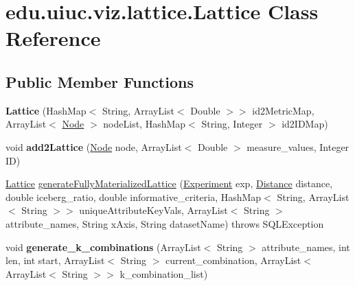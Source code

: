 \hypertarget{classedu_1_1uiuc_1_1viz_1_1lattice_1_1_lattice}{}\section{edu.\+uiuc.\+viz.\+lattice.\+Lattice Class Reference}
\label{classedu_1_1uiuc_1_1viz_1_1lattice_1_1_lattice}
\subsection*{Public Member Functions}
\begin{DoxyCompactItemize}
\item 
\mbox{\label{classedu_1_1uiuc_1_1viz_1_1lattice_1_1_lattice_a496de455ff51eeb81becb5469c24d8c8}} 
{\bfseries Lattice} (Hash\+Map$<$ String, Array\+List$<$ Double $>$$>$ id2\+Metric\+Map, Array\+List$<$ \mbox{\hyperlink{classedu_1_1uiuc_1_1viz_1_1lattice_1_1_node}{Node}} $>$ node\+List, Hash\+Map$<$ String, Integer $>$ id2\+I\+D\+Map)
\item 
\mbox{\label{classedu_1_1uiuc_1_1viz_1_1lattice_1_1_lattice_a4943398fe6944f68fd00ac4006b94403}} 
void {\bfseries add2\+Lattice} (\mbox{\hyperlink{classedu_1_1uiuc_1_1viz_1_1lattice_1_1_node}{Node}} node, Array\+List$<$ Double $>$ measure\+\_\+values, Integer ID)
\item 
\mbox{\hyperlink{classedu_1_1uiuc_1_1viz_1_1lattice_1_1_lattice}{Lattice}} \mbox{\hyperlink{classedu_1_1uiuc_1_1viz_1_1lattice_1_1_lattice_a9561521c4a9067e31306921639af5e19}{generate\+Fully\+Materialized\+Lattice}} (\mbox{\hyperlink{classedu_1_1uiuc_1_1viz_1_1algorithms_1_1_experiment}{Experiment}} exp, \mbox{\hyperlink{interfaceedu_1_1uiuc_1_1viz_1_1distance_1_1_distance}{Distance}} distance, double iceberg\+\_\+ratio, double informative\+\_\+criteria, Hash\+Map$<$ String, Array\+List$<$ String $>$$>$ unique\+Attribute\+Key\+Vals, Array\+List$<$ String $>$ attribute\+\_\+names, String x\+Axis, String dataset\+Name)  throws S\+Q\+L\+Exception
\item 
\mbox{\label{classedu_1_1uiuc_1_1viz_1_1lattice_1_1_lattice_a40477cace4b55ec366fd7a692cf290d3}} 
void {\bfseries generate\+\_\+k\+\_\+combinations} (Array\+List$<$ String $>$ attribute\+\_\+names, int len, int start, Array\+List$<$ String $>$ current\+\_\+combination, Array\+List$<$ Array\+List$<$ String $>$$>$ k\+\_\+combination\+\_\+list)
$$
\end{DoxyCompactItemize}

